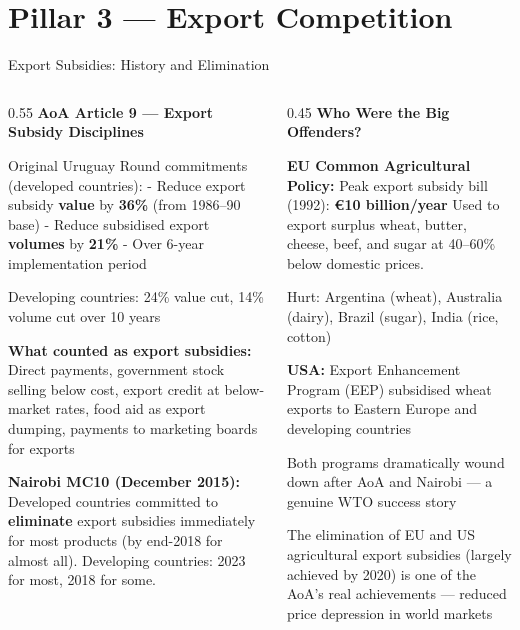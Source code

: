 \documentclass[
  ignorenonframetext,
  aspectratio=169,
]{beamer}
\makeatletter
\let\quarto@originallabel\label
\DeclareRobustCommand*{\label}[1]{\quarto@originallabel{#1}}
\makeatother
\begin{document}
\begin{frame}
\end{frame}

\section{Pillar 3 --- Export
Competition}\label{pillar-3-export-competition}

\begin{frame}{Export Subsidies: History and Elimination}
\label{export-subsidies-history-and-elimination}
\begin{columns}[T]
\begin{column}{0.55\linewidth}
\textbf{AoA Article 9 --- Export Subsidy Disciplines}

Original Uruguay Round commitments (developed countries): - Reduce
export subsidy \textbf{value} by \textbf{36\%} (from 1986--90 base) -
Reduce subsidised export \textbf{volumes} by \textbf{21\%} - Over 6-year
implementation period

Developing countries: 24\% value cut, 14\% volume cut over 10 years

\textbf{What counted as export subsidies:} Direct payments, government
stock selling below cost, export credit at below-market rates, food aid
as export dumping, payments to marketing boards for exports

\textbf{Nairobi MC10 (December 2015):} Developed countries committed to
\textbf{eliminate} export subsidies immediately for most products (by
end-2018 for almost all). Developing countries: 2023 for most, 2018 for
some.
\end{column}

\begin{column}{0.45\linewidth}
\textbf{Who Were the Big Offenders?}

\textbf{EU Common Agricultural Policy:} Peak export subsidy bill (1992):
\textbf{€10 billion/year} Used to export surplus wheat, butter, cheese,
beef, and sugar at 40--60\% below domestic prices.

Hurt: Argentina (wheat), Australia (dairy), Brazil (sugar), India (rice,
cotton)

\textbf{USA:} Export Enhancement Program (EEP) subsidised wheat exports
to Eastern Europe and developing countries

Both programs dramatically wound down after AoA and Nairobi --- a
genuine WTO success story

The elimination of EU and US agricultural export subsidies (largely
achieved by 2020) is one of the AoA's real achievements --- reduced
price depression in world markets
\end{column}
\end{columns}
\end{frame}
\end{document}
